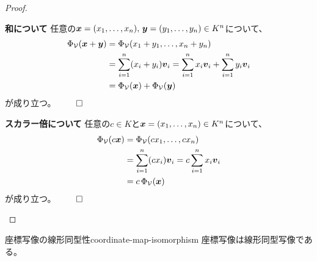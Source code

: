 \documentclass[../../../topic_linear-algebra]{subfiles}
\begin{document}
\begin{proof}
  \begin{subpattern}{\bfseries 和について}
    任意の$\vb*{x}=(x_1,\dots,x_n),\,\vb*{y}=(y_1,\dots,y_n)\in K^n$について、
    \begin{align*}
      \Phi_{\mathcal{V}}(\vb*{x}+\vb*{y})
      &=\Phi_{\mathcal{V}}(x_1+y_1,\dots,x_n+y_n) \\
      &=\sum_{i=1}^{n}(x_i+y_i)\vb*{v}_i
      =\sum_{i=1}^{n}x_i\vb*{v}_i+\sum_{i=1}^{n}y_i\vb*{v}_i \\
      &=\Phi_{\mathcal{V}}(\vb*{x})+\Phi_{\mathcal{V}}(\vb*{y})
    \end{align*}
    が成り立つ。 $\qed$
  \end{subpattern}
  
  \begin{subpattern}{\bfseries スカラー倍について}
    任意の$c\in K$と$\vb*{x}=(x_1,\dots,x_n)\in K^n$について、
    \begin{align*}
      \Phi_{\mathcal{V}}(c\vb*{x})
      &=\Phi_{\mathcal{V}}(cx_1,\dots,cx_n) \\
      &=\sum_{i=1}^{n}(c x_i)\vb*{v}_i
      =c\sum_{i=1}^{n}x_i\vb*{v}_i \\
      &=c\,\Phi_{\mathcal{V}}(\vb*{x})
    \end{align*}
    が成り立つ。 $\qed$
  \end{subpattern}
\end{proof}

\br

\begin{theorem}{座標写像の線形同型性}{coordinate-map-isomorphism}
  座標写像は線形同型写像である。
\end{theorem}
\end{document}
